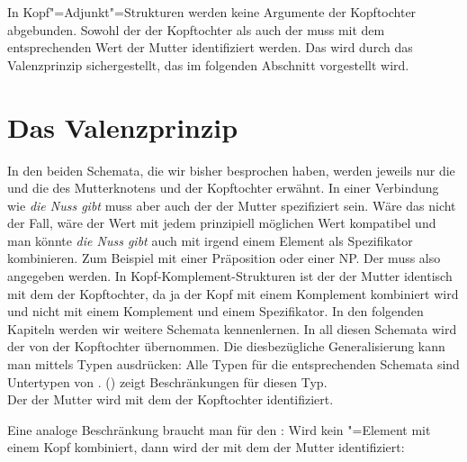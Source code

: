 In Kopf"=Adjunkt"=Strukturen werden keine Argumente der Kopftochter abgebunden. Sowohl der \sprw der
Kopftochter als auch der \compsw muss mit dem entsprechenden Wert der Mutter identifiziert
werden. Das wird durch das Valenzprinzip sichergestellt, das im folgenden Abschnitt vorgestellt wird.

\section{Das Valenzprinzip}
\label{Abschnitt-Valenzprinzip}

In den beiden Schemata, die wir bisher besprochen haben, werden jeweils nur die \sprwe und die
\compswe des Mutterknotens und der Kopftochter erwähnt. In einer Verbindung wie \emph{die Nuss gibt}
muss aber auch der \sprw der Mutter spezifiziert sein. Wäre das nicht der Fall, wäre der Wert mit
jedem prinzipiell möglichen Wert kompatibel und man könnte \emph{die Nuss gibt} auch mit irgend
einem Element als Spezifikator kombinieren. Zum Beispiel mit einer Präposition oder einer NP. Der
\sprw muss also angegeben werden. In Kopf-Komplement-Strukturen ist der \sprw der Mutter identisch
mit dem \sprw der Kopftochter, da ja der Kopf mit einem Komplement kombiniert wird und nicht mit
einem Komplement und einem Spezifikator. In den folgenden Kapiteln werden wir weitere Schemata
kennenlernen. In all diesen Schemata wird der \sprw von der Kopftochter übernommen. Die
diesbezügliche Generalisierung kann man mittels Typen ausdrücken: Alle Typen für die entsprechenden
Schemata sind Untertypen von . () zeigt Beschränkungen für
diesen Typ.
\ea
\label{type-head-non-specifier-phrase}
 \impl\\
\z
Der \sprw der Mutter wird mit dem der Kopftochter identifiziert.

Eine analoge Beschränkung braucht man für den \compsw: Wird kein \comps"=Element mit
einem Kopf kombiniert, dann wird der \compsw mit dem der Mutter identifiziert:
\ea
\label{type-head-non-complement-phrase}
 \impl\\
\z

